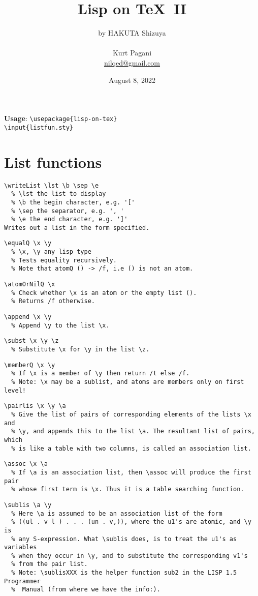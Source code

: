 \documentclass[a4paper,landscape,columns=3]{cheatsheet}
\title{Lisp on \TeX \ II}
\author{by HAKUTA Shizuya \\
\\Kurt Pagani\\\href{mailto:nilqed@gmail.com}{nilqed@gmail.com}}
\date{August 8, 2022}
\newcommand{\pT}[1]{\texttt{\textbackslash #1}}
\begin{document}
\maketitle
%
\textbf{Usage}: \pT{usepackage\{lisp-on-tex\}} \\
\pT{input\{listfun.sty\}}

\section{List functions}
\begin{lstlisting}
\writeList \lst \b \sep \e 
  % \lst the list to display
  % \b the begin character, e.g. '['
  % \sep the separator, e.g. ', '
  % \e the end character, e.g. ']'
Writes out a list in the form specified.
\end{lstlisting}
%
\begin{lstlisting}
\equalQ \x \y
  % \x, \y any lisp type
  % Tests equality recursively.
  % Note that atomQ () -> /f, i.e () is not an atom.
\end{lstlisting}
%
\begin{lstlisting}
\atomOrNilQ \x
  % Check whether \x is an atom or the empty list (). 
  % Returns /f otherwise.
\end{lstlisting}
%
\begin{lstlisting}
\append \x \y
  % Append \y to the list \x.
\end{lstlisting}
%
\begin{lstlisting}
\subst \x \y \z
  % Substitute \x for \y in the list \z.
\end{lstlisting}
%
\begin{lstlisting}
\memberQ \x \y
  % If \x is a member of \y then return /t else /f. 
  % Note: \x may be a sublist, and atoms are members only on first level!
\end{lstlisting}
%
\begin{lstlisting}
\pairlis \x \y \a
  % Give the list of pairs of corresponding elements of the lists \x and
  % \y, and appends this to the list \a. The resultant list of pairs, which 
  % is like a table with two columns, is called an association list. 
\end{lstlisting}
%
\begin{lstlisting}
\assoc \x \a
  % If \a is an association list, then \assoc will produce the first pair 
  % whose first term is \x. Thus it is a table searching function. 
\end{lstlisting}
%
\begin{lstlisting}
\sublis \a \y 
  % Here \a is assumed to be an association list of the form 
  % ((ul . v l ) . . . (un . v,)), where the u1's are atomic, and \y is 
  % any S-expression. What \sublis does, is to treat the u1's as variables 
  % when they occur in \y, and to substitute the corresponding v1's
  % from the pair list. 
  % Note: \sublisXXX is the helper function sub2 in the LISP 1.5 Programmer
  %  Manual (from where we have the info:).
\end{lstlisting}
\end{document}

